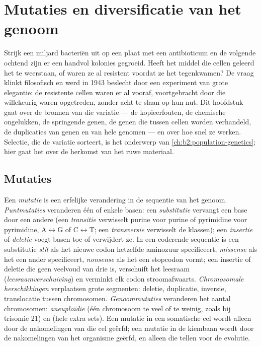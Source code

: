 \chapter{Mutaties en diversificatie van het genoom}\label{ch:b2:genome-diversification}

Strijk een miljard bacteriën uit op een plaat met een antibioticum en
de volgende ochtend zijn er een handvol kolonies gegroeid. Heeft het
middel die cellen geleerd het te weerstaan, of waren ze al resistent
voordat ze het tegenkwamen? De vraag klinkt filosofisch en werd in 1943
beslecht door een experiment van grote elegantie: de resistente cellen
waren er al vooraf, voortgebracht door  die willekeurig waren
opgetreden, zonder acht te slaan op hun nut. Dit hoofdstuk gaat over de
bronnen van die variatie --- de kopieerfouten, de chemische ongelukken,
de springende genen, de genen die tussen cellen worden verhandeld, de
duplicaties van genen en van hele genomen --- en over hoe snel ze werken.
Selectie, die de variatie sorteert, is het onderwerp van
\cref{ch:b2:population-genetics}; hier gaat het over de herkomst van het
ruwe materiaal.

\section{Mutaties}

\begin{definition}\label{def:b2:genome-diversification:mutation}
Een \emph{mutatie} is een erfelijke verandering in de sequentie van het
genoom. \emph{Puntmutaties} veranderen één of enkele basen: een
\emph{substitutie} vervangt een base door een andere (een
\emph{transitie} verwisselt purine voor purine of pyrimidine voor
pyrimidine, A$\leftrightarrow$G of C$\leftrightarrow$T; een
\emph{transversie} verwisselt de klassen); een \emph{insertie} of
\emph{deletie} voegt basen toe of verwijdert ze. In een coderende
sequentie is een substitutie \emph{stil} als het nieuwe codon hetzelfde
aminozuur specificeert, \emph{missense} als het een ander specificeert,
\emph{nonsense} als het een stopcodon vormt; een insertie of deletie die
geen veelvoud van drie is, verschuift het leesraam
(\emph{leesraamverschuiving}) en verminkt elk codon stroomafwaarts.
\emph{Chromosomale herschikkingen} verplaatsen grote segmenten: deletie,
duplicatie, inversie, translocatie tussen chromosomen.
\emph{Genoommutaties} veranderen het aantal chromosomen:
\emph{aneuploïdie} (één chromosoom te veel of te weinig, zoals bij
trisomie 21) en \emph{} (hele extra sets). Een mutatie in een
somatische cel wordt alleen door de nakomelingen van die cel geërfd; een
mutatie in de kiembaan wordt door de nakomelingen van het organisme
geërfd, en alleen die tellen voor de evolutie.
\end{definition}

